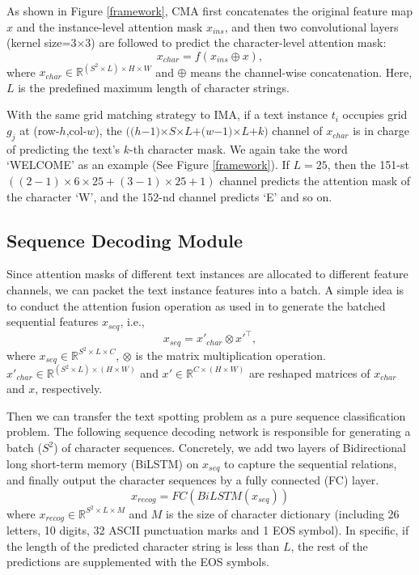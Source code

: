 \documentclass[letterpaper]{article} \usepackage{aaai21}  \usepackage{times}  \usepackage{helvet} \usepackage{courier}  \usepackage[hyphens]{url}  \usepackage{graphicx} \urlstyle{rm} \def\UrlFont{\rm}  \usepackage{natbib}  \usepackage{caption} \frenchspacing  \setlength{\pdfpagewidth}{8.5in}  \setlength{\pdfpageheight}{11in}  \usepackage{multirow}
\begin{document}
As shown in Figure \ref{framework}, CMA first concatenates the original feature map $x$ and the instance-level attention mask $x_{ins}$, and then two convolutional layers (kernel size=$3$$\times$$3$) are followed to predict the character-level attention mask:
\begin{equation}
x_{char} = f(x_{ins}\oplus x),
\end{equation}
where $x_{char} \in \mathbb{R}^{(S^2\times L) \times H \times W}$ and $\oplus$ means the channel-wise concatenation.
Here, $L$ is the predefined maximum length of character strings.

With the same grid matching strategy to IMA, if a text instance $t_i$ occupies grid $g_j$ at (row-$h$,col-$w$), the $((h$$-$$1)$$\times$$S$$\times$$L$$+$$(w$$-$$1)$$\times$$L$$+$$k)$ channel of $x_{char}$ is in charge of predicting the text's $k$-th character mask.
We again take the word `WELCOME' as an example (See Figure  \ref{framework}).
If $L=25$, then the 151-st $((2-1)\times 6\times 25 + (3-1)\times 25 + 1)$ channel predicts the attention mask of the character `W', and the 152-nd channel predicts `E' and so on.


\subsection{Sequence Decoding Module}
Since attention masks of different text instances are allocated to different feature channels, we can packet the text instance features into a batch.
A simple idea is to conduct the attention fusion operation as used in \cite{wang2020decoupled} to generate the batched sequential features $x_{seq}$, i.e.,
\begin{equation}
x_{seq} = x'_{char} \otimes x'^\top,
\label{eq1}
\end{equation}
where $x_{seq} \in \mathbb{R}^{S^2\times L \times C}$,  $\otimes$ is the matrix multiplication operation. $x'_{char}\in \mathbb{R}^{(S^2\times L) \times (H \times W)}$ and $x'\in \mathbb{R}^{C \times (H \times W)}$ are reshaped matrices of $x_{char}$ and $x$, respectively.

Then we can transfer the text spotting problem as a pure sequence classification problem.
The following sequence decoding network is responsible for generating a batch ($S^2$) of character sequences.
Concretely, we add two layers of Bidirectional long short-term memory (BiLSTM) \cite{hochreiter1997long} on $x_{seq}$ to capture the sequential relations, and finally output the character sequences by a fully connected (FC) layer.
\begin{equation}
x_{recog} = FC(BiLSTM(x_{seq}))
\label{e-recog}
\end{equation}
where $x_{recog}\in \mathbb{R}^{S^2\times L \times M}$ and $M$ is the size of character dictionary (including 26 letters, 10 digits, 32 ASCII punctuation marks and 1 EOS symbol).
In specific, if the length of the predicted character string is less than $L$, the rest of the predictions are supplemented with the EOS symbols.
\end{document}
